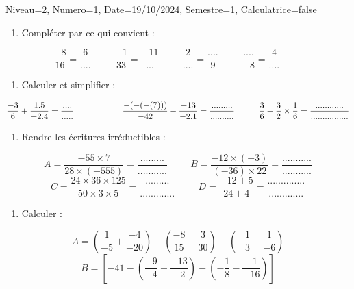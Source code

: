 \documentclass[a4paper,12pt]{article}
\begin{document}
\begin{Maquette}[DS]{Niveau=2, Numero=1, Date=19/10/2024, Semestre=1, Calculatrice=false}

\begin{exercice}
\begin{enumerate}
\item Compléter par ce qui convient :
\end{enumerate}
\[\dfrac{-8}{16}=\dfrac{6}{....} \hspace{1cm}
\dfrac{-1}{33}=\dfrac{-11}{...}\hspace{1cm}
\dfrac{2}{....}=\dfrac{....}{9} \hspace{1cm}
\dfrac{....}{-8}=\dfrac{4}{....}\hspace{1cm}\]

\end{exercice}

\begin{exercice}
\begin{enumerate}
\item Calculer et simplifier :
\end{enumerate}
$\dfrac{-3}{6}+\dfrac{1.5}{-2.4}=\dfrac{....}{.....}\hspace{2cm}
\dfrac{-(-(-(7)))}{-42}-\dfrac{-13}{-2.1}=\dfrac{.........}{..........}\hspace*{1cm} \dfrac{3}{6}+\dfrac{3}{2}\times \dfrac{1}{6}=\dfrac{............}{................}$
\end{exercice}


\begin{exercice}
\begin{enumerate}
\item Rendre les écritures irréductibles :
\end{enumerate}
\[A=\dfrac{-55\times7}{28\times(-555)} =\dfrac{.........}{...........}\hspace{1cm}
B=\dfrac{-12\times(-3)}{(-36)\times22}=\dfrac{...........}{...........}\]
\[C=\dfrac{24\times36\times125}{50\times3\times5}=\dfrac{.........}{.............} \hspace{1cm}
D=\dfrac{-12+5}{24+4}=\dfrac{..............}{.............}\]
\end{exercice}

\begin{exercice}
\begin{enumerate}
\item Calculer :
\end{enumerate}
\begin{multicols}{2}
$$A=\left( \dfrac{1}{-5}+\dfrac{-4}{-20}\right) -\left(\dfrac{-8}{15}-\dfrac{3}{30}\right) -\left( -\dfrac{1}{3}-\dfrac{1}{-6} \right)$$
\columnbreak
$$B= \left[-41-\left( \dfrac{-9}{-4}-\dfrac{-13}{-2}\right) -\left( -\dfrac{1}{8}-\dfrac{-1}{-16} \right)\right]$$
\end{multicols}
\begin{multicols}{2}
\columnbreak
{}
\end{multicols}
\end{exercice}


\end{Maquette}
\end{document}
